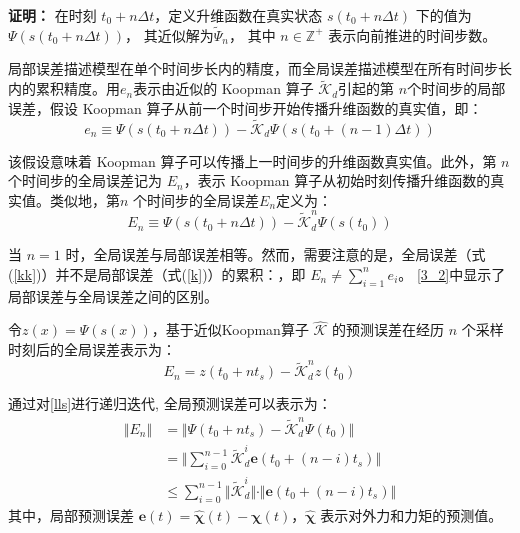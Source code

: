 \documentclass[lang=chs, degree=master, blindreview=false, winfonts=true]{yanputhesis}
\begin{document}
\textbf{证明：}
在时刻 \( t_0 + n\Delta t \)，定义升维函数在真实状态 \( s(t_0 + n\Delta t) \) 下的值为 
$
\Psi(s(t_0 + n\Delta t))$，
其近似解为$
\tilde{\Psi}_n
$，
其中 $ n \in \mathbb{Z}^+ $ 表示向前推进的时间步数。

局部误差描述模型在单个时间步长内的精度，而全局误差描述模型在所有时间步长内的累积精度。用$e_n$表示由近似的 Koopman 算子 \( \tilde{\mathcal{K}}_d \)引起的第 \( n \)个时间步的局部误差，假设 Koopman 算子从前一个时间步开始传播升维函数的真实值，即：
\begin{equation}
	e_n\equiv\Psi(s(t_0+n\Delta t))-\tilde{\mathcal{K}}_d\Psi(s(t_0+(n-1)\Delta t))
	\label{k}
\end{equation}

该假设意味着 Koopman 算子可以传播上一时间步的升维函数真实值。此外，第 \( n \) 个时间步的全局误差记为 $E_n$，表示 Koopman 算子从初始时刻传播升维函数的真实值。类似地，第\( n \) 个时间步的全局误差$E_n$定义为：
\begin{equation}
	E_n\equiv\Psi(s(t_0+n\Delta t))-\tilde{\mathcal{K}}_d^n\Psi(s(t_0))
	\label{kk}
\end{equation}

当 \( n = 1 \) 时，全局误差与局部误差相等。然而，需要注意的是，全局误差（式(\ref{kk})）并不是局部误差（式(\ref{k})）的累积：，即
$
E_n \neq \sum_{i=1}^n e_i
$。
\autoref{3_2}中显示了局部误差与全局误差之间的区别。

令$z(x)=\Psi(s(x))$，基于近似Koopman算子 $\hat{{\mathcal{K}}}$ 的预测误差在经历 $n$ 个采样时刻后的全局误差表示为：
\begin{equation}
	{E}_n = {z}(t_0 + nt_s) - \tilde{\mathcal{K}}_d^n {z}(t_0)
\end{equation}
	
通过对\autoref{lls}进行递归迭代, 全局预测误差可以表示为：
\begin{equation}
	\begin{aligned}
	\Vert {E_n} \Vert &= \Vert {\Psi}(t_0+nt_s) -\tilde{\mathcal{K}}_d^n {\Psi}(t_0) \Vert  \\
	&=\Vert \sum_{i=0}^{n-1}\tilde{\mathcal{K}}_d^i\bm{e}(t_0+(n-i)t_s)\Vert \\
	&\le \sum_{i=0}^{n-1}\Vert \tilde{\mathcal{K}}_d^i\Vert \cdot \Vert \bm{e}(t_0+(n-i)t_s) \Vert
\end{aligned}
\end{equation}
其中，局部预测误差 $\bm{e}(t)=\bm{\hat{\chi}}(t)-\bm{\chi}(t)$，$\bm{\hat{\chi}}$ 表示对外力和力矩的预测值。
\end{document}

